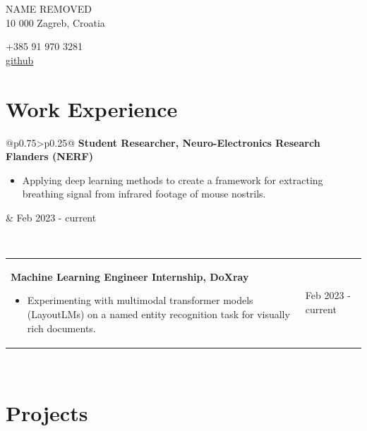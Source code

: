 \documentclass[a4paper]{article}
\makeatletter
\newlength{\tablewidth}
\newenvironment{period}[2]{%
\newcommand{\sarma}{#2}%
\setlength{\tablewidth}{\linewidth}
\addtolength{\tablewidth}{-2\tabcolsep}
\begin{tabular}{@{}p{0.75\tablewidth}>{\raggedleft\arraybackslash}p{0.25\tablewidth}@{}}%
#1 \newline
\begin{itemize}
}{%
\end{itemize} & \sarma \\%
\end{tabular}\\
}
\makeatother
\begin{document}
\fontfamily{\sfdefault}
\selectfont

\begin{minipage}{.5\textwidth}
\LARGE{NAME REMOVED}\\
\normalsize{10 000 Zagreb, Croatia}
\end{minipage}%
\begin{minipage}{.5\textwidth}
\raggedleft
+385 91 970 3281 \\
\href{https://github.com/markocvjetko}{github}
\end{minipage}

\vspace{1em}

\section{Work Experience}
    \begin{period}{\textbf{Student Researcher, Neuro-Electronics Research Flanders (NERF)}}{Feb 2023 - current}
        \item Applying deep learning methods to create a framework for extracting breathing signal from infrared footage of mouse nostrils.
    \end{period}
    \begin{period}{\textbf{Machine Learning Engineer Internship, DoXray}}{Jun 2022 - Sep 2022}
        \item Experimenting with multimodal transformer models (LayoutLMs) on a named entity recognition task for visually rich documents.  
    \end{period}
\section{Projects}
\end{document}
